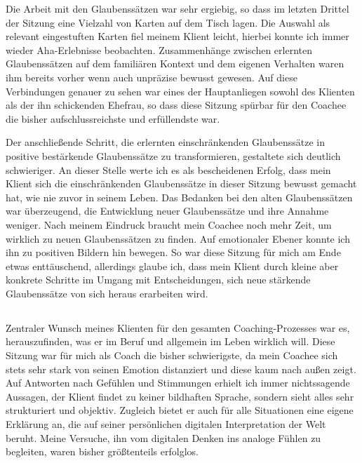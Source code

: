 \documentclass[11pt,a4paper]{article}
\begin{document}
Die Arbeit mit den Glaubenssätzen war sehr ergiebig, so dass im letzten Drittel der Sitzung eine Vielzahl von Karten auf dem Tisch lagen. Die Auswahl als relevant eingestuften Karten fiel meinem Klient leicht, hierbei konnte ich immer wieder Aha-Erlebnisse beobachten. Zusammenhänge zwischen erlernten Glaubenssätzen auf dem familiären Kontext und dem eigenen Verhalten waren ihm bereits vorher wenn auch unpräzise bewusst gewesen. Auf diese Verbindungen genauer zu sehen war eines der Hauptanliegen sowohl des Klienten als der ihn schickenden Ehefrau, so dass diese Sitzung spürbar für den Coachee die bisher aufschlussreichste und erfüllendste war. 

Der anschließende Schritt, die erlernten einschränkenden Glaubenssätze in positive bestärkende Glaubenssätze zu transformieren, gestaltete sich deutlich schwieriger. An dieser Stelle werte ich es als bescheidenen Erfolg, dass mein Klient sich die einschränkenden Glaubenssätze in dieser Sitzung bewusst gemacht hat, wie nie zuvor in seinem Leben. Das Bedanken bei den alten Glaubenssätzen war überzeugend, die Entwicklung neuer Glaubenssätze und ihre Annahme weniger. Nach meinem Eindruck braucht mein Coachee noch mehr Zeit, um wirklich zu neuen Glaubenssätzen zu finden. Auf emotionaler Ebener konnte ich ihn zu positiven Bildern hin bewegen. So war diese Sitzung für mich am Ende etwas enttäuschend, allerdings glaube ich, dass mein Klient durch kleine aber konkrete Schritte im Umgang mit Entscheidungen, sich neue stärkende Glaubenssätze von sich heraus erarbeiten wird.





\subsection*{\color{Orange}{Vierte Sitzung: Identifikation der persönlichen Wünsche und Bedürfnisse}}


Zentraler Wunsch meines Klienten für den gesamten Coaching-Prozesses war es, herauszufinden, was er im Beruf und allgemein im Leben wirklich will. Diese Sitzung war für mich als Coach die bisher schwierigste, da mein Coachee sich stets sehr stark von seinen Emotion distanziert und diese kaum nach außen zeigt. Auf Antworten nach Gefühlen und  Stimmungen erhielt ich immer nichtssagende Aussagen, der Klient findet zu keiner bildhaften Sprache, sondern sieht alles sehr strukturiert und objektiv. Zugleich bietet er auch für alle Situationen eine eigene Erklärung an, die auf seiner persönlichen digitalen Interpretation der Welt beruht. Meine Versuche, ihn vom digitalen Denken ins analoge Fühlen zu begleiten, waren bisher größtenteils erfolglos. 
\end{document}
